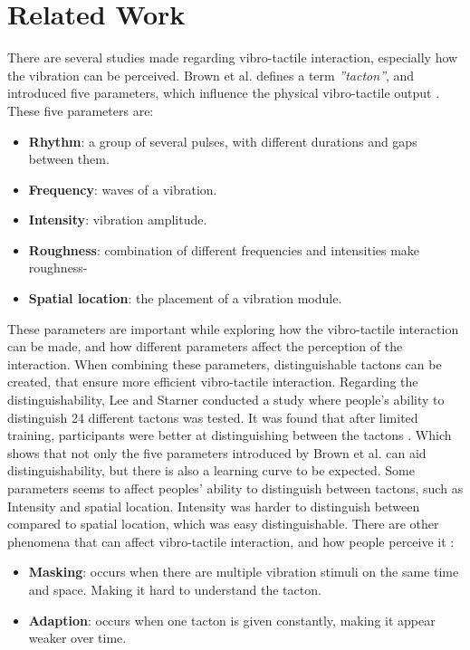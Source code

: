 \documentclass{sigchi}
\begin{document}
\section{Related Work}
There are several studies made regarding vibro-tactile interaction, especially how the vibration can be perceived. 
\newline
Brown et al. defines a term \textit{''tacton''}, and introduced five parameters, which influence the physical vibro-tactile output \cite{brown06}. These five parameters are:
\begin{itemize}
\item \textbf{Rhythm}: a group of several pulses, with different durations and gaps between them.
\item \textbf{Frequency}: waves of a vibration.
\item \textbf{Intensity}: vibration amplitude.
\item \textbf{Roughness}: combination of different frequencies and intensities make roughness-
\item \textbf{Spatial location}: the placement of a vibration module.
\end{itemize}
These parameters are important while exploring how the vibro-tactile interaction can be made, and how different parameters affect the perception of the interaction. When combining these parameters, distinguishable tactons can be created, that ensure more efficient vibro-tactile interaction. Regarding the distinguishability, Lee and Starner conducted a study where people's ability to distinguish 24 different tactons was tested. It was found that after limited training, participants were better at distinguishing between the tactons \cite{lee10}. Which shows that not only the five parameters introduced by Brown et al. can aid distinguishability, but there is also a learning curve to be expected. 
\newline
\newline
Some parameters seems to affect peoples' ability to distinguish between tactons, such as Intensity and spatial location. Intensity was harder to distinguish between compared to spatial location, which was easy distinguishable. 
\newline
\newline
There are other phenomena that can affect vibro-tactile interaction, and how people perceive it \cite{myles07}: 
\begin{itemize}
\item \textbf{Masking}: occurs when there are multiple vibration stimuli on the same time and space. Making it hard to understand the tacton. 
\item \textbf{Adaption}: occurs when one tacton is given constantly, making it appear weaker over time.
\end{itemize}
\end{document}
